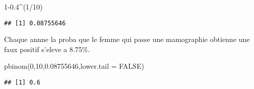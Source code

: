 \documentclass[
]{article}
\newenvironment{Shaded}{\begin{snugshade}}{\end{snugshade}}
\newcommand{\AttributeTok}[1]{\textcolor[rgb]{0.77,0.63,0.00}{#1}}
\newcommand{\ConstantTok}[1]{\textcolor[rgb]{0.00,0.00,0.00}{#1}}
\newcommand{\DecValTok}[1]{\textcolor[rgb]{0.00,0.00,0.81}{#1}}
\newcommand{\FloatTok}[1]{\textcolor[rgb]{0.00,0.00,0.81}{#1}}
\newcommand{\FunctionTok}[1]{\textcolor[rgb]{0.00,0.00,0.00}{#1}}
\newcommand{\NormalTok}[1]{#1}
\newcommand{\SpecialCharTok}[1]{\textcolor[rgb]{0.00,0.00,0.00}{#1}}
\begin{document}
\begin{Shaded}
\begin{Highlighting}[]
\DecValTok{1}\FloatTok{{-}0.4}\SpecialCharTok{\^{}}\NormalTok{(}\DecValTok{1}\SpecialCharTok{/}\DecValTok{10}\NormalTok{)}
\end{Highlighting}
\end{Shaded}

\begin{verbatim}
## [1] 0.08755646
\end{verbatim}

Chaque annne la proba que le femme qui passe une mamographie obtienne
une faux positif s'eleve a 8.75\%.

\begin{Shaded}
\begin{Highlighting}[]
\FunctionTok{pbinom}\NormalTok{(}\DecValTok{0}\NormalTok{,}\DecValTok{10}\NormalTok{,}\FloatTok{0.08755646}\NormalTok{,}\AttributeTok{lower.tail =} \ConstantTok{FALSE}\NormalTok{)}
\end{Highlighting}
\end{Shaded}

\begin{verbatim}
## [1] 0.6
\end{verbatim}
\end{document}
